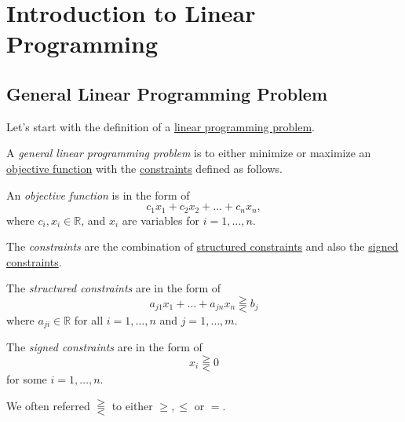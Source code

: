 \chapter{Introduction to Linear Programming}
\section{General Linear Programming Problem}
Let's start with the definition of a \hyperref[def:general-linear-programming-problem]{linear programming problem}.
\begin{definition}\label{def:general-linear-programming-problem}
	A \emph{general linear programming problem} is to either minimize or maximize an \hyperref[def:objective-function]{objective function} with the \hyperref[def:constraint]{constraints} defined as follows.

	\begin{definition}\label{def:objective-function}
		An \emph{objective function} is in the form of
		\[
			c_1 x_1 + c_2 x_2 + \dots +c_n x_n,
		\]
		where \(c_i, x_i \in \mathbb{R}\), and \(x_{i}\) are variables for \(i = 1, \dots, n\).
	\end{definition}

	\begin{definition}[Constraint]\label{def:constraint}
		The \emph{constraints} are the combination of \hyperref[def:structured-constraint]{structured constraints} and also the \hyperref[def:signed-constraint]{signed constraints}.
		\begin{definition}\label{def:structured-constraint}
			The \emph{structured constraints} are in the form of
			\[
				a_{j1} x_1 + \dots + a_{jn}x_n \gtreqqless b_j
			\]
			where \(a_{ji}\in \mathbb{R} \) for all \(i=1, \dots , n\) and \(j = 1, \dots, m\).
		\end{definition}
		\begin{definition}\label{def:signed-constraint}
			The \emph{signed constraints} are in the form of
			\[
				x_i \gtreqqless 0
			\]
			for some \(i=1, \dots , n\).
		\end{definition}
	\end{definition}
\end{definition}

\begin{notation}
	We often referred \(\gtreqqless \) to either \(\geq , \leq\) or \(=\).
\end{notation}

